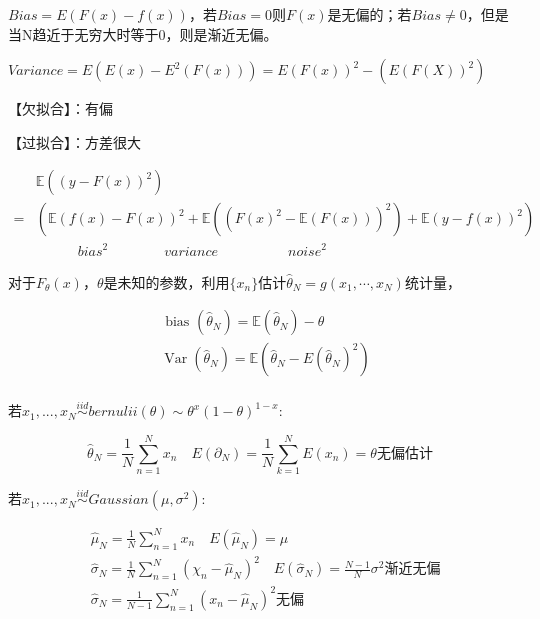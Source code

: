 \documentclass[12pt,UTF8,AutoFakeBold]{article}
\begin{document}
$Bias = E(F(x)-f(x))$，若$Bias = 0$则$F(x)$是无偏的；若$Bias \neq 0$，但是当N趋近于无穷大时等于0，则是渐近无偏。

$Variance = E(E(x)-E^2(F(x))) = E(F(x))^2 - (E(F(X))^2)$

【欠拟合】：有偏

【过拟合】：方差很大

\begin{equation}
\begin{aligned} 
& \mathbb{E}\left((y-F(x))^{2}\right)\\ =&\left(\mathbb{E}(f(x)-F(x))^{2}+\mathbb{E}\left(\left(F(x)^{2}-\mathbb{E}(F(x))\right)^{2}\right)+\mathbb{E}(y-f(x))^{2}\right)\\
& \quad\quad\quad bias^2 \quad\quad\quad\quad variance \quad\quad\quad\quad\quad noise^2
\end{aligned}
\end{equation}

对于$F_\theta(x)$，$\theta$是未知的参数，利用$\{x_n\}$估计${\hat{\theta}_{N}=g\left(x_{1}, \cdots, x_{N}\right)}$统计量，

\begin{equation}
\begin{aligned}
& \text { bias }\left(\hat{\theta}_{N}\right)=\mathbb{E}\left(\hat{\theta}_{N}\right)-\theta \\
& \operatorname{Var}\left(\hat{\theta}_{N}\right)=\mathbb{E}\left(\hat{\theta}_{N}-E\left(\hat{\theta}_{N}\right)^{2}\right)\\
\end{aligned}
\end{equation}

若${x_1,...,x_N}\overset { iid }{ \sim  } bernulii(\theta) \sim \theta^{x}(1-\theta)^{1-x}$:

\begin{equation}
\hat{\theta}_{N}=\frac{1}{N} \sum_{n=1}^{N} x_{n} \quad E\left(\partial_{N}\right)=\frac{1}{N} \sum_{k=1}^{N} E\left(x_{n}\right)=\theta \text{无偏估计}
\end{equation}

若${x_1,...,x_N}\overset { iid }{ \sim  } Gaussian(\mu, \sigma^2)$:

\begin{equation}
\begin{aligned}
& \hat { \mu  } _{ N }=\frac { 1 }{ N } \sum _{ n=1 }^{ N }{ x_{ n } } \quad E\left( \hat { \mu  } _{ N } \right) =\mu \\
& \hat{\sigma}_{N}=\frac{1}{N} \sum_{n=1}^{N}\left(\chi_{n}-\hat{\mu}_{N}\right)^{2} \quad E\left(\hat{\sigma}_{N}\right)=\frac{N-1}{N} \sigma^{2} \text{渐近无偏}\\
& \hat{\sigma}_{N}=\frac{1}{N-1} \sum_{n=1}^{N}\left(x_{n}-\hat{\mu}_{N}\right)^{2} \text{无偏}\\
\end{aligned}
\end{equation}
\end{document}
